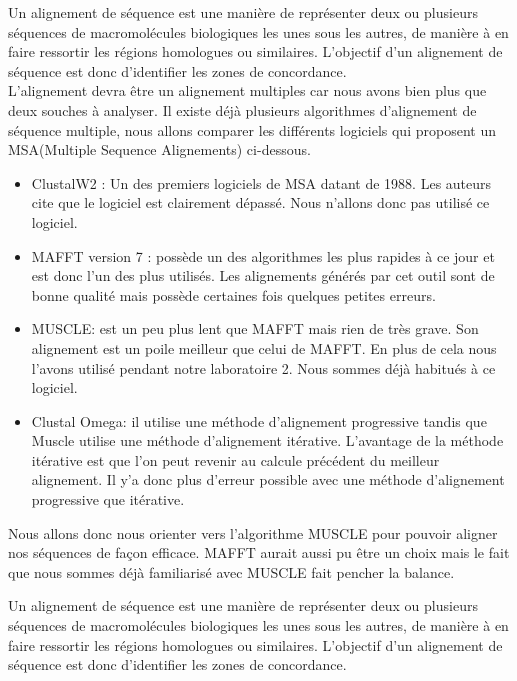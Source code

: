 \documentclass{article}
\begin{document}
Un alignement de séquence est une manière de représenter deux ou plusieurs séquences de macromolécules biologiques les unes sous les autres, de manière à en faire ressortir les régions homologues ou similaires. L'objectif d'un alignement de séquence est donc d'identifier les zones de concordance. \\

 L'alignement devra être un alignement multiples car nous avons bien plus que deux souches à analyser. Il existe déjà plusieurs algorithmes d'alignement de séquence multiple, nous allons comparer les différents logiciels qui proposent un MSA(Multiple Sequence Alignements) ci-dessous.
 
 
\begin{itemize}
  \item ClustalW2 : Un des premiers logiciels de MSA datant de 1988. Les auteurs cite que le logiciel est clairement dépassé. Nous n'allons donc pas utilisé ce logiciel. 
  \item MAFFT version 7 : possède un des algorithmes les plus rapides à ce jour et est donc l'un des plus utilisés. Les alignements générés par cet outil sont de bonne qualité mais possède certaines fois quelques petites erreurs.
  
  \item MUSCLE: est un peu plus lent que MAFFT mais rien de très grave. Son alignement est un poile meilleur que celui de MAFFT. En plus de cela nous l'avons utilisé pendant notre laboratoire 2. Nous sommes déjà habitués à ce logiciel. 

	\item Clustal Omega: il utilise une méthode d'alignement progressive tandis que Muscle utilise une méthode d'alignement itérative. L'avantage de la méthode itérative est que l'on peut revenir au calcule précédent du meilleur alignement. Il y'a donc plus d'erreur possible avec une méthode d'alignement progressive que itérative.
	
\end{itemize}

Nous allons donc nous orienter vers l'algorithme MUSCLE pour pouvoir aligner nos séquences de façon efficace. MAFFT aurait aussi pu être un choix mais le fait que nous sommes déjà familiarisé avec MUSCLE fait pencher la balance. 

    Un alignement de séquence est une manière de représenter deux ou plusieurs séquences de macromolécules biologiques les unes sous les autres, de manière à en faire ressortir les régions homologues ou similaires. L'objectif d'un alignement de séquence est donc d'identifier les zones de concordance.
\end{document}
